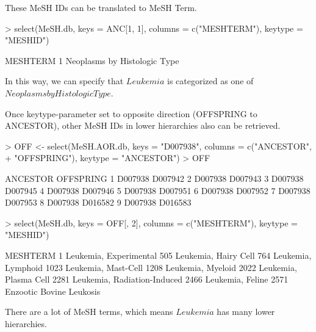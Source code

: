 \documentclass[11pt]{article}
\begin{document}
These MeSH IDs can be translated to MeSH Term.
\begin{center}
\begin{Schunk}
\begin{Sinput}
> select(MeSH.db, keys = ANC[1, 1], columns = c("MESHTERM"), keytype = "MESHID")
\end{Sinput}
\begin{Soutput}
                      MESHTERM
1 Neoplasms by Histologic Type
\end{Soutput}
\end{Schunk}
\end{center}
In this way, we can specify that $Leukemia$ is categorized as one of $Neoplasms by Histologic Type$.

Once keytype-parameter set to opposite direction (OFFSPRING to ANCESTOR), other MeSH IDs in lower hierarchies also can be retrieved.
\begin{center}
\begin{Schunk}
\begin{Sinput}
> OFF <- select(MeSH.AOR.db, keys = "D007938", columns = c("ANCESTOR", 
+     "OFFSPRING"), keytype = "ANCESTOR")
> OFF
\end{Sinput}
\begin{Soutput}
  ANCESTOR OFFSPRING
1  D007938   D007942
2  D007938   D007943
3  D007938   D007945
4  D007938   D007946
5  D007938   D007951
6  D007938   D007952
7  D007938   D007953
8  D007938   D016582
9  D007938   D016583
\end{Soutput}
\begin{Sinput}
> select(MeSH.db, keys = OFF[, 2], columns = c("MESHTERM"), keytype = "MESHID")
\end{Sinput}
\begin{Soutput}
                        MESHTERM
1         Leukemia, Experimental
505         Leukemia, Hairy Cell
764           Leukemia, Lymphoid
1023         Leukemia, Mast-Cell
1208           Leukemia, Myeloid
2022       Leukemia, Plasma Cell
2281 Leukemia, Radiation-Induced
2466            Leukemia, Feline
2571    Enzootic Bovine Leukosis
\end{Soutput}
\end{Schunk}
\end{center}
There are a lot of MeSH terms, which means $Leukemia$ has many lower hierarchies.\\
\end{document}
